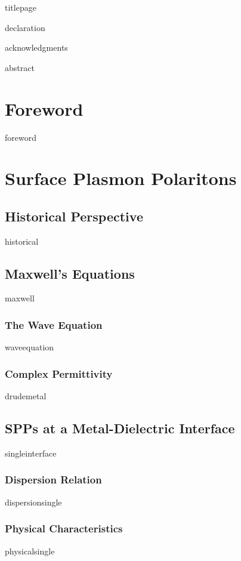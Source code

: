 \documentclass[a4paper,titlepage,onecolumn]{report}
\begin{document}
{titlepage}

{declaration}

{acknowledgments}

\tableofcontents

{abstract}



\chapter{Foreword} \label{ch:foreword}
{foreword}

\chapter{Surface Plasmon Polaritons} \label{ch:spp}
 \section{Historical Perspective}
 {historical}
 \section{Maxwell's Equations}
 {maxwell}
  \subsection{The Wave Equation}
  {waveequation}
  \subsection{Complex Permittivity}
  {drudemetal}
 \section{SPPs at a Metal-Dielectric Interface}
 {singleinterface}
  \subsection{Dispersion Relation}
  {dispersionsingle}
  \subsection{Physical Characteristics}
  {physicalsingle}
\end{document}
